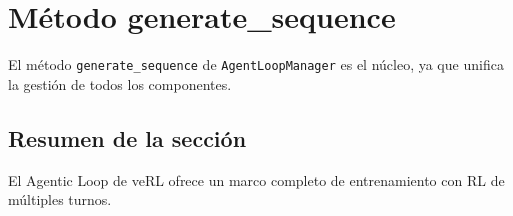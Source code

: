 \section{Método generate\_sequence}
El método \texttt{generate\_sequence} de \texttt{AgentLoopManager} es el núcleo, ya que unifica la gestión de todos los componentes.

\subsection{Resumen de la sección}
El Agentic Loop de veRL ofrece un marco completo de entrenamiento con RL de múltiples turnos.

